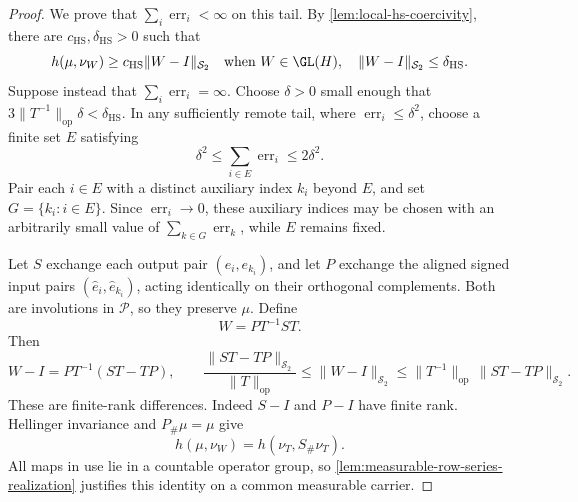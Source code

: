 \begin{proof}
We prove that $\sum_i\operatorname{err}_i<\infty$ on this tail.
By
\cref{lem:local-hs-coercivity}, there are
$c_{\mathrm{HS}},\delta_{\mathrm{HS}}>0$ such
that
\begin{equation}
 h(\mu,\nu_W)\geq c_{\mathrm{HS}}\|W-I\|_{\mathcal S_2}
 \quad\text{when }W\in\GL(H),\quad
 \|W-I\|_{\mathcal S_2}\leq\delta_{\mathrm{HS}}.
 \label{eq:local-lower-used}
\end{equation}
Suppose instead that $\sum_i\operatorname{err}_i=\infty$.
Choose $\delta>0$ small enough that
$3\|T^{-1}\|_{\mathrm{op}}\delta<\delta_{\mathrm{HS}}$.
In any sufficiently remote tail, where
$\operatorname{err}_i\leq\delta^2$, choose a finite set $E$ satisfying
\begin{equation}
 \delta^2\leq\sum_{i\in E}\operatorname{err}_i\leq2\delta^2.
 \label{eq:active-tail-error}
\end{equation}
Pair each $i\in E$ with a distinct auxiliary index
$k_i$ beyond $E$, and set $G=\{k_i:i\in E\}$.
Since $\operatorname{err}_i\to0$, these auxiliary indices may be chosen with
an arbitrarily small value of $\sum_{k\in G}\operatorname{err}_k$, while
$E$ remains fixed.

Let $S$ exchange each output pair $(e_i,e_{k_i})$, and let $P$ exchange
the aligned signed input pairs $(\widehat e_i,\widehat e_{k_i})$, acting
identically on their orthogonal complements.  Both are involutions in
$\mathcal P$, so they preserve $\mu$.  Define
\[
 W=P T^{-1} S T.
\]
Then
\begin{equation}
 W-I=P T^{-1}(ST-TP),\qquad
 \frac{\|ST-TP\|_{\mathcal S_2}}{\|T\|_{\mathrm{op}}}
 \leq\|W-I\|_{\mathcal S_2}
 \leq\|T^{-1}\|_{\mathrm{op}}\,\|ST-TP\|_{\mathcal S_2}.
 \label{eq:swap-relative-norm}
\end{equation}
These are finite-rank differences.
Indeed $S-I$ and $P-I$ have finite rank.
Hellinger invariance and $P_\#\mu=\mu$ give
\begin{equation}
 h(\mu,\nu_W)=h(\nu_T,S_\#\nu_T).
 \label{eq:swap-hellinger-identity}
\end{equation}
All maps in use lie in a countable operator group, so
\cref{lem:measurable-row-series-realization} justifies this identity on a
common measurable carrier.


\end{proof}
